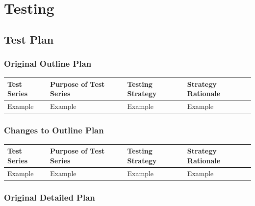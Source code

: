 \chapter{Testing}

\section{Test Plan}

\begin{landscape}
\subsection{Original Outline Plan}

\begin{center}
    \begin{tabular}{|p{2cm}|p{5cm}|p{5cm}|p{4cm}|}
        \hline
        \textbf{Test Series} & \textbf{Purpose of Test Series} & \textbf{Testing Strategy} & \textbf{Strategy Rationale}\\ \hline
        Example & Example & Example & Example \\ \hline
    \end{tabular}
\end{center}

\subsection{Changes to Outline Plan}

\begin{center}
    \begin{tabular}{|p{2cm}|p{5cm}|p{5cm}|p{4cm}|}
        \hline
        \textbf{Test Series} & \textbf{Purpose of Test Series} & \textbf{Testing Strategy} & \textbf{Strategy Rationale}\\ \hline
        Example & Example & Example & Example \\ \hline
    \end{tabular}
\end{center}

\subsection{Original Detailed Plan}


\end{landscape}

